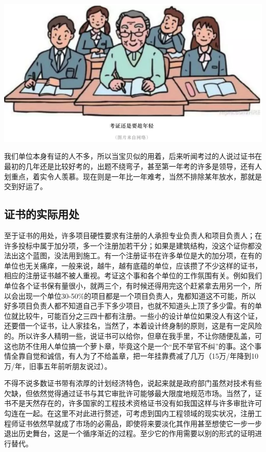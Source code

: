 \documentclass[]{book}
\begin{document}
\includegraphics[width=8.33in]{images/kaozheng4}

我们单位本身有证的人不多，所以当宝贝似的用着，后来听闻考过的人说过证书在最初的几年还是比较好考的，出题不绕弯子，甚至第一年考的许多是领导，还有人划重点，着实令人羡慕。现在则是一年比一年难考，当然不排除某年放水，那就是交到好运了。

\hypertarget{ux8bc1ux4e66ux7684ux5b9eux9645ux7528ux5904}{%
\subsection{证书的实际用处}\label{ux8bc1ux4e66ux7684ux5b9eux9645ux7528ux5904}}

至于证书的用处，许多项目硬性要求有注册的人承担专业负责人和项目负责人；在许多投标中属于加分项，多一个注册加若干分；如果是建筑结构，没这个证你都没法出这个蓝图，没法用到施工。有一个注册证书在许多单位是大的加分项，在有的单位也无关痛痒，一般来说，越牛，越有底蕴的单位，应该攒了不少这样的证书，相应的注册证书越不被人重视。考证这个事和各个单位的工作氛围有关。例如我们单位各个证书保有量很小，就两三个，有时候还得用完这个赶紧拿去用另一个，所以会出现一个单位30-50\%的项目都是一个项目负责人，鬼都知道这不可能，所以好多项目负责人都不知道自己手下多少项目，也就不知道头上顶了多少雷。有的单位就比较牛，可能百分之三四十都有注册。一些小的设计单位如果没人有这个证，还要借一个证书，让人家挂名，当然了，本着设计终身制的原则，这是有一定风险的。所以许多人精明一些，说证书可以给你，但章在我手里，不让你随便乱盖，可这也防不住用人单位搞一个萝卜章，毕竟这个是一个``民不举官不纠''的事。这个事情全靠自觉和诚信，有人为了不给盖章，把一年挂靠费减了几万（15万/年降到10万/年，旧事五年前听朋友说过）。

不得不说多数证书带有浓厚的计划经济特色，说起来就是政府部门虽然对技术有些欠缺，但依然觉得通过证书与其它审批许可能够最大限度地规范市场。当然了，证书不是天然存在的，许多国家的工程技术资格证书没有如我国这样与许多审批许可勾连在一起。在这里不对此进行赘述，可考虑到国内工程领域的现实状况，注册工程师证书依然早就成了市场的必需品，即使将来要淡化其作用甚至想使它一步一步退出历史舞台，这是一个循序渐近的过程。至少它的作用需要以别的形式的证明进行替代。
\end{document}

